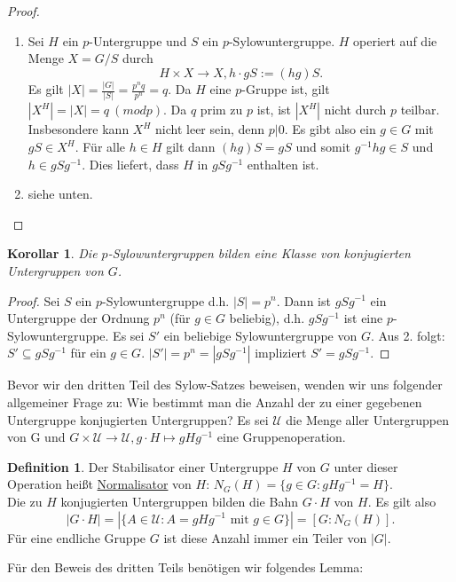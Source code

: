 \documentclass[12pt]{scrartcl}%
\newtheorem{kor}{Korollar}
\theoremstyle{definition}
\newtheorem*{defn}{Definition}
\theoremstyle{remark}
\begin{document}
\begin{proof}
\begin{enumerate}
	\item Sei $H$ ein $p$-Untergruppe und $S$ ein $p$-Sylowuntergruppe. $H$ operiert auf die Menge $X = G/S$ durch
	$$ H \times X \rightarrow X, h \cdot gS := (hg)S.$$
	Es gilt $|X| = \frac{|G|}{|S|} = \frac{p^nq}{p^n} = q$. Da $H$ eine $p$-Gruppe ist, gilt $|X^H| = |X| = q \ (modp)$. Da $q$ prim zu $p$ ist, ist $|X^H|$ nicht durch $p$ teilbar. Insbesondere kann $X^H$ nicht leer sein, denn $p|0$. Es gibt also ein $g \in G$ mit $gS \in X^H$. Für alle $h \in H$ gilt dann $(hg)S = gS$ und somit $g^{-1}hg \in S$ und $h \in gSg^{-1}$. Dies liefert, dass $H$ in $gSg^{-1}$ enthalten ist.
	
	\item siehe unten.
\end{enumerate}
\end{proof}

\begin{kor}
	Die $p$-Sylowuntergruppen bilden eine Klasse von konjugierten Untergruppen von $G$.
\end{kor}

\begin{proof}
	Sei $S$ ein $p$-Sylowuntergruppe d.h. $|S| = p^n$. Dann ist $gSg^{-1}$ ein Untergruppe der Ordnung $p^n$ (für $g \in G$ beliebig), d.h. $gSg^{-1}$ ist eine $p$-Sylowuntergruppe. Es sei $S'$ ein beliebige Sylowuntergruppe von $G$. Aus 2. folgt: $S' \subseteq gSg^{-1}$ für ein $g \in G$. $|S'| = p^n = |gSg^{-1}|$ impliziert $S' = gSg^{-1}$.
\end{proof}

Bevor wir den dritten Teil des Sylow-Satzes beweisen, wenden wir uns folgender allgemeiner Frage zu: Wie bestimmt man die Anzahl der zu einer gegebenen Untergruppe konjugierten Untergruppen? Es sei $\mathcal{U}$ die Menge aller Untergruppen von G und $ G \times \mathcal{U} \rightarrow \mathcal{U}, g \cdot H \mapsto gHg^{-1} $ eine Gruppenoperation.

\begin{defn}
	Der Stabilisator einer Untergruppe $H$ von $G$ unter dieser Operation heißt \underline{Normalisator} von $H$: $N_G(H) = \{ g \in G: gHg^{-1} = H \}$. \\
	Die zu $H$ konjugierten Untergruppen bilden die Bahn $G \cdot H$ von $H$. Es gilt also
	$$ |G \cdot H| = | \{ A \in \mathcal{U} : A = gHg^{-1} \text{ mit } g \in G \} | = [G:N_G(H)] .$$
	Für eine endliche Gruppe $G$ ist diese Anzahl immer ein Teiler von $|G|$.
\end{defn}

Für den Beweis des dritten Teils benötigen wir folgendes Lemma:
\end{document}
